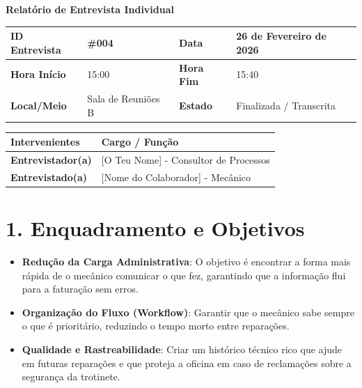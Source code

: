 \documentclass[11pt,a4paper]{article}
\begin{document}
	
	{\noindent\LARGE\bfseries\color{primaryblue} Relatório de Entrevista Individual}
	\\[0.5cm]
	
	\renewcommand{\arraystretch}{1.5}
	\begin{tabularx}{\textwidth}{@{}|l|X|l|X|@{}}
		\hline
		\rowcolor{gray!10} \textbf{ID Entrevista} & \#004 & \textbf{Data} & 26 de Fevereiro de 2026 \\ \hline
		\textbf{Hora Início} & 15:00 & \textbf{Hora Fim} & 15:40 \\ \hline
		\textbf{Local/Meio} & Sala de Reuniões B & \textbf{Estado} & Finalizada / Transcrita \\ \hline
	\end{tabularx}
	
	\vspace{0.5cm}
	
	\begin{tabularx}{\textwidth}{@{}|l|X|@{}}
		\hline
		\rowcolor{gray!10} \textbf{Intervenientes} & \textbf{Cargo / Função} \\ \hline
		\textbf{Entrevistador(a)} & [O Teu Nome] - Consultor de Processos \\ \hline
		\textbf{Entrevistado(a)}  & [Nome do Colaborador] - Mecânico \\ \hline
	\end{tabularx}
	
	\vspace{0.8cm}
	
	\section*{1. Enquadramento e Objetivos}
	\begin{itemize}[leftmargin=*, label=\small\color{primaryblue}$\blacksquare$]
		\item \textbf{Redução da Carga Administrativa}: O objetivo é encontrar a forma mais rápida de o mecânico comunicar o que fez, garantindo que a informação flui para a faturação sem erros.
		\item \textbf{Organização do Fluxo (Workflow)}: Garantir que o mecânico sabe sempre o que é prioritário, reduzindo o tempo morto entre reparações.
		\item \textbf{Qualidade e Rastreabilidade}: Criar um histórico técnico rico que ajude em futuras reparações e que proteja a oficina em caso de reclamações sobre a segurança da trotinete.
	\end{itemize}
	
\end{document}
